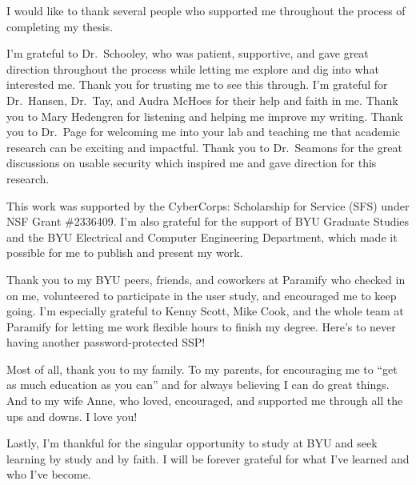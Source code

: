 \begin{acknowledgments}
	I would like to thank several people who supported me throughout the process of completing my thesis.

	I'm grateful to Dr.~Schooley, who was patient, supportive, and gave great direction throughout the process while letting me explore and dig into what interested me.
	Thank you for trusting me to see this through.
	I'm grateful for Dr.~Hansen, Dr.~Tay, and Audra McHoes for their help and faith in me.
	Thank you to Mary Hedengren for listening and helping me improve my writing.
	Thank you to Dr.~Page for welcoming me into your lab and teaching me that academic research can be exciting and impactful.
	Thank you to Dr.~Seamons for the great discussions on usable security which inspired me and gave direction for this research.

	This work was supported by the CyberCorps\textregistered{}: Scholarship for Service (SFS) under NSF Grant \#2336409. I'm also grateful for the support of BYU Graduate Studies and the BYU Electrical and Computer Engineering Department, which made it possible for me to publish and present my work.

	Thank you to my BYU peers, friends, and coworkers at Paramify who checked in on me, volunteered to participate in the user study, and encouraged me to keep going.
	I'm especially grateful to Kenny Scott, Mike Cook, and the whole team at Paramify for letting me work flexible hours to finish my degree. Here's to never having another password-protected SSP!

	Most of all, thank you to my family.
	To my parents, for encouraging me to ``get as much education as you can'' and for always believing I can do great things.
	And to my wife Anne, who loved, encouraged, and supported me through all the ups and downs.
	I love you!

	Lastly, I'm thankful for the singular opportunity to study at BYU and seek learning by study and by faith.
	I will be forever grateful for what I've learned and who I've become.
\end{acknowledgments}
